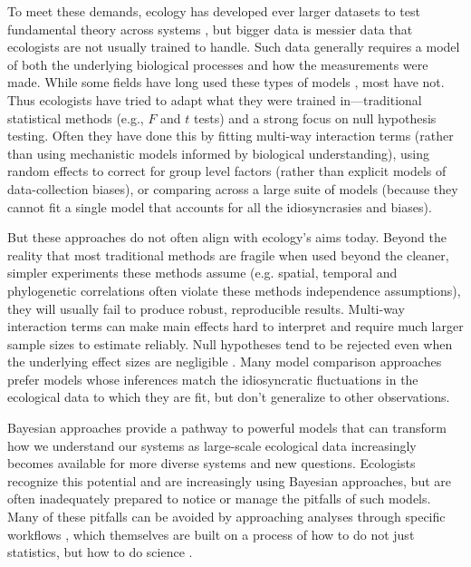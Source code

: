 \documentclass[11pt]{article}
\begin{document}
To meet these demands, ecology has developed ever larger datasets to test fundamental theory across systems \citep{Hampton2013}, but bigger data is messier data that ecologists are  not usually trained to handle. Such data generally requires a model of both the underlying biological processes and how the measurements were made. While some fields have long used these types of models \citep[generally in fields focused on inferring population sizes of things people want to eat or manage,][]{muthuku2008,zheng2007,trijoulet2018,strinella2020potential}, most have not. Thus ecologists have tried to adapt what they were trained in---traditional statistical methods (e.g., $F$ and $t$ tests) and a strong focus on null hypothesis testing. Often they have done this by fitting multi-way interaction terms (rather than using mechanistic models informed by biological understanding), using random effects to correct for group level factors (rather than explicit models of data-collection biases), or comparing across a large suite of models (because they cannot fit a single model that accounts for all the idiosyncrasies and biases). %

But these approaches do not often align with ecology's aims today. Beyond the reality that most traditional methods are fragile when used beyond the cleaner, simpler experiments these methods assume (e.g. spatial, temporal and phylogenetic correlations often violate these methods independence assumptions), they will usually fail to produce robust, reproducible results. Multi-way interaction terms can make main effects hard to interpret and require much larger sample sizes to estimate reliably. Null hypotheses tend to be rejected even when the underlying effect sizes are negligible \citep{gelmanhill,muff2022rewriting}. Many model comparison approaches prefer models whose inferences match the idiosyncratic fluctuations in the ecological data to which they are fit, but don’t generalize to other observations.

Bayesian approaches provide a pathway to powerful models that can transform how we understand our systems as large-scale ecological data increasingly becomes available for more diverse systems and new questions. Ecologists recognize this potential and are increasingly using Bayesian approaches, but are often inadequately prepared to notice or manage the pitfalls of such models. Many of these pitfalls can be avoided by approaching analyses through specific workflows \citep{betanworkflow,grinsztajn2021,vandeschoot2021}, which themselves are built on a process of how to do not just statistics, but how to do science \citep{box1976science}. %
\end{document}
